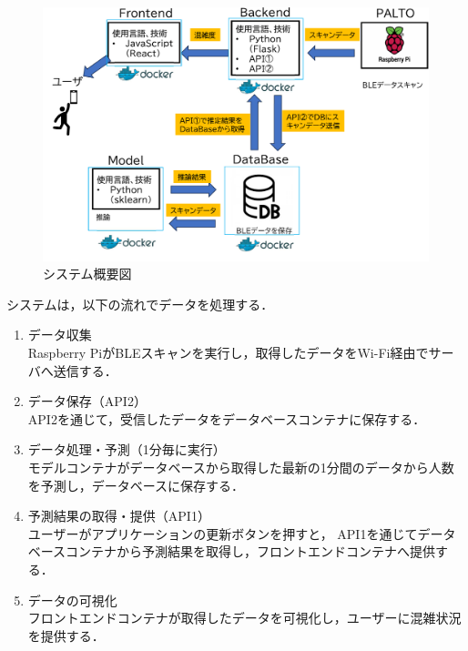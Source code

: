 \begin{figure}[tb]
	\centering
	\includegraphics[width=12cm]{./outline_drawing.pdf}
	\caption{システム概要図}
	\label{fig:システム概要図}
\end{figure}

システムは，以下の流れでデータを処理する．

\begin{enumerate}
	\item データ収集　\\
	Raspberry PiがBLEスキャンを実行し，取得したデータをWi-Fi経由でサーバへ送信する．
	
	\item データ保存（API2） \\
	API2を通じて，受信したデータをデータベースコンテナに保存する．
	
	\item データ処理・予測（1分毎に実行） \\
	モデルコンテナがデータベースから取得した最新の1分間のデータから人数を予測し，データベースに保存する．
	
	\item 予測結果の取得・提供（API1） \\
	ユーザーがアプリケーションの更新ボタンを押すと，
	API1を通じてデータベースコンテナから予測結果を取得し，フロントエンドコンテナへ提供する．
	
	\item データの可視化 \\
	フロントエンドコンテナが取得したデータを可視化し，ユーザーに混雑状況を提供する．
\end{enumerate}
